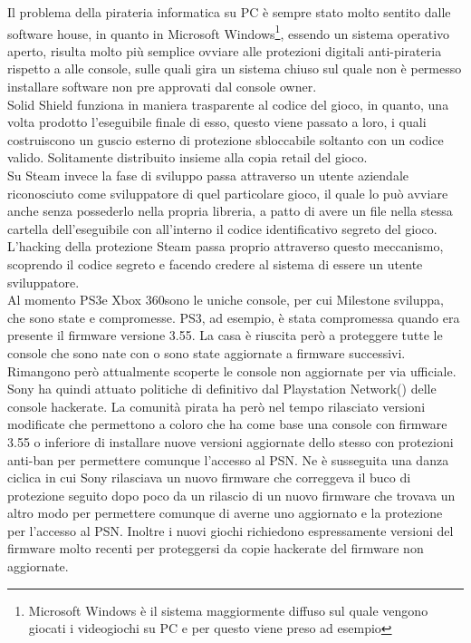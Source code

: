 Il problema della pirateria informatica su PC è sempre stato molto sentito dalle software house, in quanto in Microsoft Windows\footnote{Microsoft Windows è il sistema maggiormente diffuso sul quale vengono giocati i videogiochi su PC e per questo viene preso ad esempio}, essendo un sistema operativo aperto, risulta molto più semplice ovviare alle protezioni digitali anti-pirateria rispetto a alle console, sulle quali gira un sistema chiuso sul quale non è permesso installare software non pre approvati dal console owner.\\

Solid Shield funziona in maniera trasparente al codice del gioco, in quanto, una volta prodotto l'eseguibile finale di esso, questo viene passato a loro, i quali costruiscono un guscio esterno di protezione sbloccabile soltanto con un codice valido. Solitamente distribuito insieme alla copia retail del gioco.\\

Su Steam invece la fase di sviluppo passa attraverso un utente aziendale riconosciuto come sviluppatore di quel particolare gioco, il quale lo può avviare anche senza possederlo nella propria libreria, a patto di avere un file nella stessa cartella dell'eseguibile con all'interno il codice identificativo segreto del gioco. L'hacking della protezione Steam passa proprio attraverso questo meccanismo, scoprendo il codice segreto e facendo credere al sistema di essere un utente sviluppatore.\\

Al momento PS3\textregistered e Xbox 360\textregistered sono le uniche console, per cui Milestone sviluppa, che sono state  e compromesse.
PS3\textregistered, ad esempio, è stata compromessa quando era presente il firmware versione 3.55. La casa è riuscita però a proteggere tutte le console che sono nate con o sono state aggiornate a firmware successivi. Rimangono però attualmente scoperte le console non aggiornate per via ufficiale. Sony ha quindi attuato politiche di  definitivo dal Playstation Network\textregistered () delle console hackerate. La comunità pirata ha però nel tempo rilasciato versioni modificate che permettono a coloro che ha come base una console con firmware 3.55 o inferiore di installare nuove versioni aggiornate dello stesso con protezioni anti-ban per permettere comunque l'accesso al PSN\textregistered. Ne è susseguita una danza ciclica in cui Sony rilasciava un nuovo firmware che correggeva il buco di protezione seguito dopo poco da un rilascio di un nuovo firmware che trovava un altro modo per permettere comunque di averne uno aggiornato e la protezione per l'accesso al PSN\textregistered. Inoltre i nuovi giochi richiedono espressamente versioni del firmware molto recenti per proteggersi da copie hackerate del firmware non aggiornate.\\

